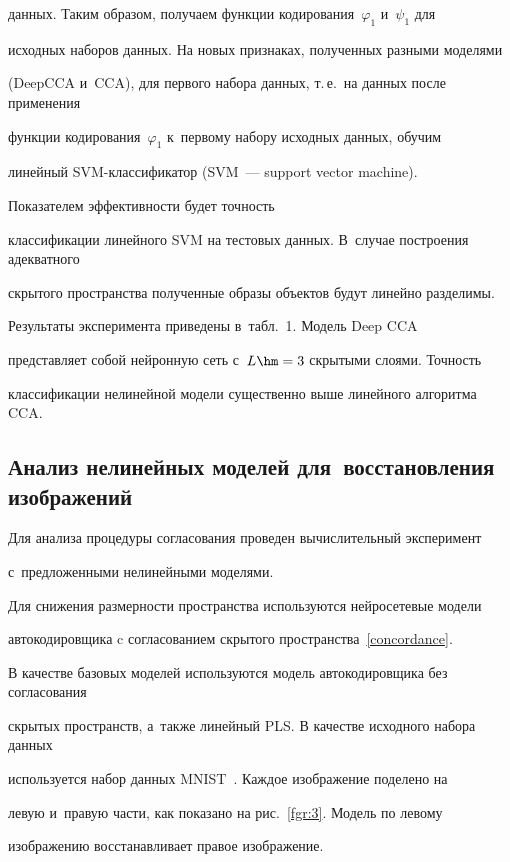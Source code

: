 данных. Таким образом, получаем функции кодирования~$\varphi_1$ и~$\psi_1$ для 

исходных наборов данных. На новых признаках, полученных разными моделями 

(DeepCCA и~CCA), для первого набора данных, т.\,е.\ на данных после применения 

функции кодирования~$\varphi_1$ к~первому набору исходных данных, обучим 

линейный SVM-клас\-си\-фи\-ка\-тор (SVM~--- support vector machine). 

Показателем эффективности будет точность 

классификации линейного SVM на тестовых данных. В~случае построения адекватного 

скрытого пространства полученные образы объектов будут линейно разделимы. 

Результаты эксперимента приведены в~табл.~1. Модель Deep CCA 

представляет собой нейронную сеть с~$L\hm=3$ скрытыми слоями. Точность 

классификации нелинейной модели существенно выше линейного алгоритма CCA.



\subsection{Анализ нелинейных моделей для~восстановления изображений}



Для анализа процедуры согласования проведен вычислительный эксперимент 

с~предложенными нелинейными моделями.

Для снижения размерности пространства используются нейросетевые модели 

автокодировщика c согласованием скрытого пространства~\eqref{concordance}.

В качестве базовых моделей используются модель автокодировщика без согласования 

скрытых пространств, а~также линейный PLS. В качестве исходного набора данных 

используется набор данных MNIST~\cite{MNIST}. Каждое изображение поделено на 

левую и~правую части, как показано на рис.~\ref{fgr:3}. Модель по левому 

изображению восстанавливает правое изображение.



